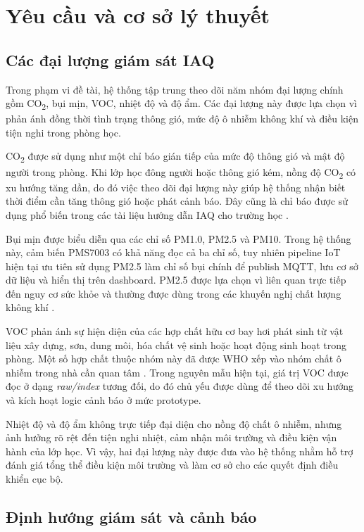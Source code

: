 \section{Yêu cầu và cơ sở lý thuyết}

\subsection{Các đại lượng giám sát IAQ}

Trong phạm vi đề tài, hệ thống tập trung theo dõi năm nhóm đại lượng chính gồm
CO\textsubscript{2}, bụi mịn, VOC, nhiệt độ và độ ẩm. Các đại lượng này được lựa chọn
vì phản ánh đồng thời tình trạng thông gió, mức độ ô nhiễm không khí và điều kiện tiện
nghi trong phòng học.

CO\textsubscript{2} được sử dụng như một chỉ báo gián tiếp của mức độ thông gió và mật
độ người trong phòng. Khi lớp học đông người hoặc thông gió kém, nồng độ
CO\textsubscript{2} có xu hướng tăng dần, do đó việc theo dõi đại lượng này giúp hệ
thống nhận biết thời điểm cần tăng thông gió hoặc phát cảnh báo. Đây cũng là chỉ báo
được sử dụng phổ biến trong các tài liệu hướng dẫn IAQ cho trường học
\cite{epaiaqschools,alaiaqschools}.

Bụi mịn được biểu diễn qua các chỉ số PM1.0, PM2.5 và PM10. Trong hệ thống này, cảm
biến PMS7003 có khả năng đọc cả ba chỉ số, tuy nhiên pipeline IoT hiện tại ưu tiên sử
dụng PM2.5 làm chỉ số bụi chính để publish MQTT, lưu cơ sở dữ liệu và hiển thị trên
dashboard. PM2.5 được lựa chọn vì liên quan trực tiếp đến nguy cơ sức khỏe và thường
được dùng trong các khuyến nghị chất lượng không khí \cite{whoaqg2021}.

VOC phản ánh sự hiện diện của các hợp chất hữu cơ bay hơi phát sinh từ vật liệu xây
dựng, sơn, dung môi, hóa chất vệ sinh hoặc hoạt động sinh hoạt trong phòng. Một số hợp
chất thuộc nhóm này đã được WHO xếp vào nhóm chất ô nhiễm trong nhà cần quan tâm
\cite{whoiaq}. Trong nguyên mẫu hiện tại, giá trị VOC được đọc ở dạng \textit{raw/index}
tương đối, do đó chủ yếu được dùng để theo dõi xu hướng và kích hoạt logic cảnh báo ở
mức prototype.

Nhiệt độ và độ ẩm không trực tiếp đại diện cho nồng độ chất ô nhiễm, nhưng ảnh hưởng
rõ rệt đến tiện nghi nhiệt, cảm nhận môi trường và điều kiện vận hành của lớp học. Vì
vậy, hai đại lượng này được đưa vào hệ thống nhằm hỗ trợ đánh giá tổng thể điều kiện
môi trường và làm cơ sở cho các quyết định điều khiển cục bộ.

\subsection{Định hướng giám sát và cảnh báo}

